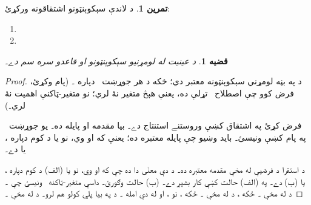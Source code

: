 \documentclass[12pt,a4paper,oneside]{report}
\newcommand{\olfileid}[3]{\gdef\pspart{#1}\gdef\pschapter{#2}\gdef\pssection{#3}}
\gdef\pspart{#2}\gdef\pschapter{#3}\gdef\pssection{}%
\newtheorem{prop}[thm]{قضيه}
\theoremstyle{definition}
\newtheorem{prob}[thm]{تمرين}
\begin{document}
\label{olpseg:OLP-0082-B012:start}
\begin{prob}
د لاندې سېکوېنټونو اشتقاقونه ورکړئ:
\begin{enumerate}
\item \LR{$\Sequent \lforall[x][\lforall[y][((x = y \land !A(x)) \lif !A(y))]]$}
\item {}
\end{enumerate}
\end{prob}
\label{olpseg:OLP-0082-B012:end}

\label{olpseg:OLP-0083-B004:start}
\olfileid{fol}{seq}{sid}
\label{olpseg:OLP-0083-B004:end}

\label{olpseg:OLP-0083-B005:start}
\label{olpseg:OLP-0083-B005:end}

\label{olpseg:OLP-0083-B006:start}
\begin{prop}
 د عينيت له لومړنيو سېکوېنټونو او قاعدو سره سم دے۔
\end{prop}
\label{olpseg:OLP-0083-B006:end}

\label{olpseg:OLP-0083-B007:start}
\begin{proof}
د \LR{${} \Sequent \eq[t][t]$} په بڼه لومړني سېکوېنټونه معتبر دي؛
ځکه د هر جوړښت~ دپاره
۔ (پام وکړئ، فرض کوو چې اصطلاح~ تړلې ده،
يعنې هېڅ متغير نۀ لري؛ نو متغير-ټاکنې اهميت نۀ لري۔)
\label{olpseg:OLP-0083-B007:end}

\label{olpseg:OLP-0083-B008:start}
فرض کړئ په اشتقاق کښې وروستنے استنتاج \LR{$=$} دے۔ بيا مقدمه
 او پايله
 ده۔ يو
جوړښت~ په پام کښې ونيسئ۔ بايد وښيو چې پايله
معتبره ده؛ يعنې که  او
 وي، نو يا د کوم  دپاره
، يا  دے۔
\label{olpseg:OLP-0083-B008:end}

\label{olpseg:OLP-0083-B009:start}
د استقرا د فرضيې له مخې مقدمه معتبره ده۔ د دې معنٰی دا ده چې که
 او  وي، نو يا
(الف) د کوم  دپاره ، يا
(ب)  دے۔ په (الف) حالت کښې کار بشپړ دے۔ (ب)
حالت وګورئ۔ داسې متغير-ټاکنه~ ونيسئ چې
۔ د
 له مخې
۔ ځکه ، د
 له مخې
۔ ځکه ، نو
، او له دې امله
۔ د
 په بيا پلي کولو
 هم لرو۔ د
 له مخې
۔
\end{proof}
\label{olpseg:OLP-0083-B009:end}
\end{document}
